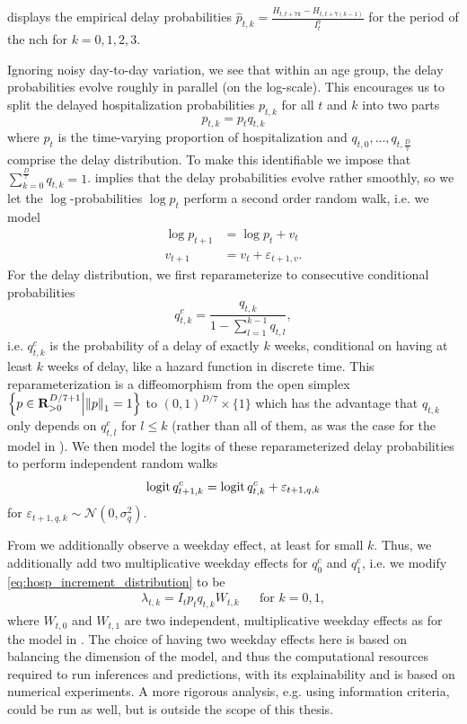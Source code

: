  displays the empirical delay probabilities $\hat p_{t,k} = \frac{H_{t, t + 7k} - H_{t,t + 7 (k - 1)}}{I^{7}_t}$ for the period of the \gls{nch} for $k = 0, 1, 2, 3$.

Ignoring noisy day-to-day variation, we see that within an age group, the delay probabilities evolve roughly in parallel (on the log-scale). This encourages us to split the delayed hospitalization probabilities $p_{t,k}$ for all $t$ and $k$ into two parts 
$$
    p_{t,k} = p_{t}q_{t,k}
$$
where $p_{t}$ is the time-varying proportion of hospitalization and $q_{t,0}, \dots, q_{t,\frac{D}{7}}$ comprise the delay distribution. To make this identifiable we impose that $\sum_{k = 0}^{\frac{D}{7}} q_{t,k} = 1$.
 implies that the delay probabilities evolve rather smoothly, so we let the $\log$-probabilities $\log p_{t}$ perform a second order random walk, i.e. we model
\begin{align*}
    \log p^{}_{t + 1} &= \log p^{}_t + v_t \\
    v_{t + 1} &= v_{t} + \varepsilon_{t + 1, v}.
\end{align*}
For the delay distribution, we first reparameterize to consecutive conditional probabilities 
$$
    q^{c}_{t,k} = \frac{q_{t,k}}{1 - \sum_{l = 1}^{k - 1} q_{t,l}},
$$
i.e. $q^{c}_{t,k}$ is the probability of a delay of exactly $k$ weeks, conditional on having at least $k$ weeks of delay, like a hazard function in discrete time. This reparameterization is a diffeomorphism from the open simplex $\left\{p \in \mathbf R^{D / 7 + 1}_{> 0} \middle| \left\lVert p \right\rVert_{1} = 1 \right\}$ to $(0, 1)^{D / 7} \times \{1\}$ which has the advantage that $q_{t,k}$ only depends on $q^{c}_{t,l}$ for $l \leq k$ (rather than all of them, as was the case for the model in ). We then model the logits of these reparameterized delay probabilities to perform independent random walks 
$$
    \operatorname{logit} q^{c}_{t+1,k} = \operatorname{logit} q^{c}_{t,k} + \varepsilon_{t + 1,q,k}
$$
for $\varepsilon_{t + 1, q, k} \sim \mathcal N(0, \sigma^{2}_{q})$. 

From  we additionally observe a weekday effect, at least for small $k$. Thus, we additionally add two multiplicative weekday effects for $q^{c}_0$ and $q^{c}_1$, i.e. we modify \eqref{eq:hosp_increment_distribution} to be
\begin{align}
    \label{eq:hosp_lambda_weekday}
    \lambda_{t,k} = I_{t} p_{t} q_{t,k} W_{t,k} && \text{for } k = 0, 1,
\end{align}
where $W_{t,0}$ and $W_{t,1}$ are two independent, multiplicative weekday effects as for the model in . The choice of having two weekday effects here is based on balancing the dimension of the model, and thus the computational resources required to run inferences and predictions, with its explainability and is based on numerical experiments. A more rigorous analysis, e.g. using information criteria, could be run as well, but is outside the scope of this thesis.

